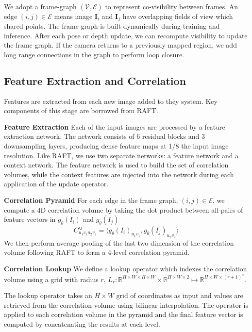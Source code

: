 \documentclass{article}
\begin{document}
We adopt a frame-graph $(\mathcal{V}, \mathcal{E})$ to represent co-visibility between frames. An edge $(i, j) \in \mathcal{E}$ means image $\mathbf{I}_i$ and $\mathbf{I}_j$ have overlapping fields of view which shared points. The frame graph is built dynamically during training and inference. After each pose or depth update, we can recompute visibility to update the frame graph. If the camera returns to a previously mapped region, we add long range connections in the graph to perform loop closure.

\vspace{-1mm}
\subsection{Feature Extraction and Correlation}
\vspace{-1mm}
Features are extracted from each new image added to they system. Key components of this stage are borrowed from RAFT\cite{raft}.

\noindent \textbf{Feature Extraction} Each of the input images are processed by a feature extraction network. The network consists of 6 residual blocks and 3 downsampling layers, producing dense feature maps at 1/8 the input image resolution. Like RAFT\cite{raft}, we use two separate networks: a feature network and a context network. The feature network is used to build the set of correlation volumes, while the context features are injected into the network during each application of the update operator.

\noindent \textbf{Correlation Pyramid} For each edge in the frame graph, $(i,j) \in \mathcal{E}$, we compute a 4D correlation volume by taking the dot product between all-pairs of feature vectors in $g_\theta(I_i)$ and $g_\theta(I_j)$
\begin{equation}
    C_{u_1 v_1 u_2 v_2}^{ij} = \langle g_\theta(I_i)_{u_1 v_1}, g_\theta(I_j)_{u_2 v_2} \rangle
\end{equation}
We then perform average pooling of the last two dimension of the correlation volume following RAFT\cite{raft} to form a 4-level correlation pyramid.

\noindent \textbf{Correlation Lookup } We define a lookup operator which indexes the correlation volume using a grid with radius $r$, $L_r: \mathbb{R}^{H\times W\times H\times W} \times \mathbb{R}^{H\times W \times 2} \mapsto \mathbb{R}^{H\times W \times (r+1)^2}$.

The lookup operator takes an $H\times W$ grid of coordinates as input and values are retrieved from the correlation volume using bilinear interpolation. The operator is applied to each correlation volume in the pyramid and the final feature vector is computed by concatenating the results at each level.
\end{document}
